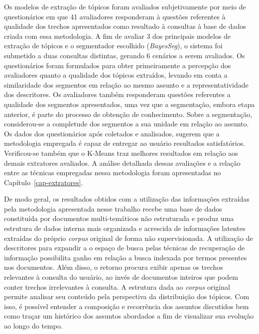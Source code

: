 

Os modelos de extração de tópicos foram avaliados subjetivamente por meio de questionários em que 41 avaliadores responderam à questões referentes à qualidade dos trechos apresentados como resultado à consultas à base de dados criada com essa metodologia. 
A fim de avaliar 3 dos principais modelos de extração de tópicos e o segmentador escolhido (\textit{BayesSeg}), o sistema foi submetido a duas consultas distintas, gerando 6 cenários a serem avaliados. 
Os questionários foram formulados para obter primeiramente a percepção dos avaliadores quanto a qualidade dos tópicos extraídos, levando em conta a similaridade dos segmentos em relação ao mesmo assunto e a representatividade dos descritores. 
Os avaliadores também responderam questões referentes a qualidade dos segmentos apresentados, uma vez que a segmentação, embora etapa anterior, é parte do processo de obtenção de conhecimento. Sobre a segmentação, considerou-se a completude dos segmentos a sua unidade em relação ao assunto.
Os dados dos questionários após coletados e analisados, sugerem que a metodologia empregada é capaz de entregar ao usuário resultados satisfatórios. Verificou-se também que o K-Means traz melhores resultados em relação aos demais extratores avaliados. 
A análise detalhada dessas avaliações e a relação entre as técnicas empregadas nessa metodologia foram apresentadas no Capítulo~\ref{cap-extratores}.





De modo geral, os resultados obtidos com a utilização das informações extraídas pela metodologia apresentada nesse trabalho recebe uma base de dados constituída por documentos multi-temáticos não estruturada e produz uma estrutura de dados interna mais organizada e acrescida de informações latentes extraídas do próprio \textit{corpus} original de forma não supervisionada. 
A utilização de descritores para expandir a o espaço de busca pelas técnicas de recuperação de informação possibilita ganho em relação a busca indexada por termos presentes nos documentos. Além disso, o retorno procura exibir apenas os trechos relevantes à consulta do usuário, ao invés de documentos inteiros que podem conter trechos irrelevantes à consulta.  
A estrutura dada ao \textit{corpus} original permite analisar seu conteúdo pela perspectiva da distribuição dos tópicos. Com isso, é possível entender a composição e recorrência dos assuntos discutidos bem como traçar um histórico dos assuntos abordados a fim de visualizar sua evolução ao longo do tempo.



